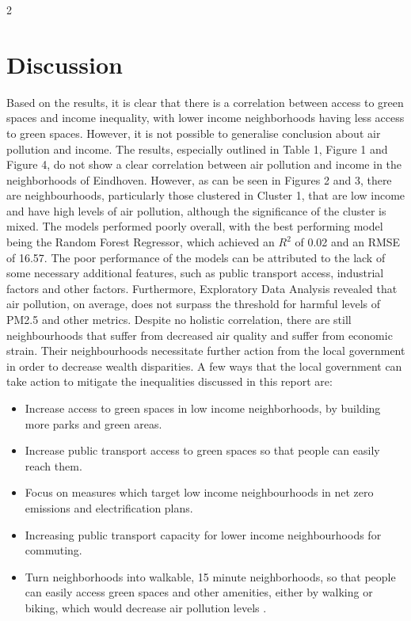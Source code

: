 \documentclass[12pt, a4paper]{article}
\begin{document}
\begin{multicols}{2}
    \section{Discussion}
    Based on the results, it is clear that there is a correlation between access to green spaces and income inequality, with lower income neighborhoods having less access to green spaces. However, it is not possible to generalise conclusion about air pollution and income. The results, especially outlined in Table 1, Figure 1 and Figure 4, do not show a clear correlation between air pollution and income in the neighborhoods of Eindhoven. However, as can be seen in Figures 2 and 3, there are neighbourhoods, particularly those clustered in Cluster 1, that are low income and have high levels of air pollution, although the significance of the cluster is mixed. 
    The models performed poorly overall, with the best performing model being the Random Forest Regressor, which achieved an $R^2$ of 0.02 and an RMSE of 16.57. The poor performance of the models can be attributed to the lack of some necessary additional features, such as public transport access, industrial factors and other factors. Furthermore, Exploratory Data Analysis revealed that air pollution, on average, does not surpass the threshold for harmful levels of PM2.5 and other metrics. Despite no holistic correlation, there are still neighbourhoods that suffer from decreased air quality and suffer from economic strain. Their neighbourhoods necessitate further action from the local government in order to decrease wealth disparities.
    \linebreak
    A few ways that the local government can take action to mitigate the inequalities discussed in this report are:
    \begin{itemize}
        \item Increase access to green spaces in low income neighborhoods, by building more parks and green areas.
        \item Increase public transport access to green spaces so that people can easily reach them.
        \item Focus on measures which target low income neighbourhoods in net zero emissions and electrification plans.
        \item Increasing public transport capacity for lower income neighbourhoods for commuting.
        \item Turn neighborhoods into walkable, 15 minute neighborhoods, so that people can easily access green spaces and other amenities, either by walking or biking, which would decrease air pollution levels \cite{smartcities8020053}.

\end{itemize}
\end{multicols}
\end{document}
